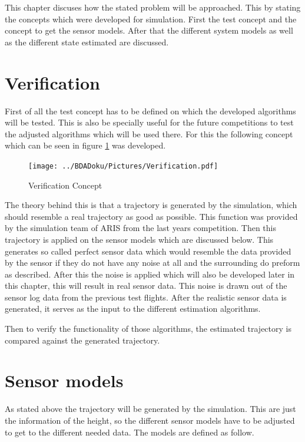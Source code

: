 
  This chapter discuses how the stated problem will be approached.
  This by stating the concepts which were developed for simulation.
  First the test concept and the concept to get the sensor models.
  After that the different system models as well as the different state estimated are discussed.
  
  \section{Verification}
  First of all the test concept has to be defined on which the developed algorithms will be tested.
  This is also be specially useful for the future competitions to test the adjusted algorithms which will be used there.
  For this the following concept which can be seen in figure \ref{fig:Verification} was developed.
  
  \begin{figure}[h!]
   \centering
   \texttt{[image: ../BDADoku/Pictures/Verification.pdf]}
   \caption{Verification Concept}
   \label{fig:Verification}
  \end{figure}

  The theory behind this is that a trajectory is generated by the simulation, which should resemble a real trajectory as good as possible.
  This function was provided by the simulation team of ARIS from the last years competition.
  Then this trajectory is applied on the sensor models which are discussed below.
  This generates so called perfect sensor data which would resemble the data provided by the sensor if they do not have any noise at all and the surrounding do preform as described. 
  After this the noise is applied which will also be developed later in this chapter, this will result in real sensor data. 
  This noise is drawn out of the sensor log data from the previous test flights.
  After the realistic sensor data is generated, it serves as the input to the different estimation algorithms.
  
  Then to verify the functionality of those algorithms, the estimated trajectory is compared against the generated trajectory.
  
  
  \section{Sensor models}
  As stated above the trajectory will be generated by the simulation. 
  This are just the information of the height, so the different sensor models have to be adjusted to get to the different needed data.
  The models are defined as follow.
  
